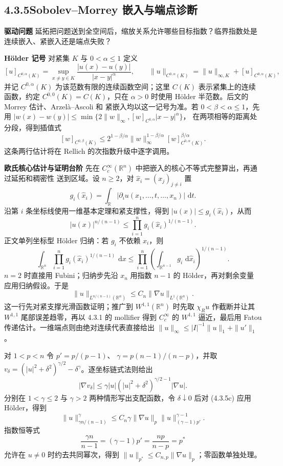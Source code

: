 \documentclass[11pt,a4paper]{ctexart}
\newcommand{\R}{\mathbb R}
\newcommand{\dd}{\,\mathrm d}
\newcommand{\planitem}[1]{\par\smallskip\noindent\textcolor{deepblue}{\textbf{#1}}\quad}
\newcommand{\unithead}[2]{\subsection{#1\quad #2}}
\begin{document}
\unithead{4.3.5}{Sobolev--Morrey 嵌入与端点诊断}

\planitem{驱动问题}
延拓把问题送到全空间后，缩放关系允许哪些目标指数？临界指数处是连续嵌入、紧嵌入还是端点失败？

\planitem{H\"older 记号}
对紧集 $K$ 与 $0<\alpha\le1$ 定义
\[
[u]_{C^{0,\alpha}(K)}=\sup_{x\ne y\in K}
\frac{|u(x)-u(y)|}{|x-y|^\alpha},
\qquad
\|u\|_{C^{0,\alpha}(K)}=\|u\|_{\infty,K}+[u]_{C^{0,\alpha}(K)},
\]
并记 $C^{0,\alpha}(K)$ 为该范数有限的连续函数空间；这里 $C(K)$ 表示紧集上的连续函数，约定 $C^{0,0}(K)=C(K)$，只在
$\alpha>0$ 时使用 Hölder 半范数。后文的 Morrey 估计、Arzel\`a--Ascoli 和
紧嵌入均以这一记号为准。若 $0<\beta<\alpha\le1$，先用
$|w(x)-w(y)|\le\min\{2\|w\|_\infty,[w]_{C^{0,\alpha}}|x-y|^\alpha\}$，
在两项相等的距离处分段，得到插值式
\[
 [w]_{C^{0,\beta}(K)}
 \le 2^{1-\beta/\alpha}\|w\|_\infty^{1-\beta/\alpha}
 [w]_{C^{0,\alpha}(K)}^{\beta/\alpha}.
\]
这条两行估计将在 Rellich 的次指数升级中逐字调用。

\planitem{欧氏核心估计与证明台阶}
先在 $C_c^\infty(\R^n)$ 中把嵌入的核心不等式完整算出，再通过延拓和稠密性
送到区域。设 $n\ge2$，对 $\widehat x_i=(x_j)_{j\ne i}$ 置
\[
 g_i(\widehat x_i)=\int_\R|\partial_i u(x_1,\ldots,t,\ldots,x_n)|\,\dd t .
\]
沿第 $i$ 条坐标线使用一维基本定理和紧支撑性，得到
$|u(x)|\le g_i(\widehat x_i)$，从而
\[
 |u(x)|^{n/(n-1)}\le
 \prod_{i=1}^n g_i(\widehat x_i)^{1/(n-1)}. \tag{4.3.5a}
\]
正文单列坐标型 Hölder 归纳：若 $g_i$ 不依赖 $x_i$，则
\[
 \int_{\R^n}\prod_{i=1}^n g_i(\widehat x_i)^{1/(n-1)}\,\dd x
 \le \prod_{i=1}^n\left(\int_{\R^{n-1}}g_i\,\dd\widehat x_i\right)^{1/(n-1)}. \tag{4.3.5b}
\]
$n=2$ 时直接用 Fubini；归纳步先沿 $x_n$ 用指数 $n-1$ 的 Hölder，再对剩余变量
应用归纳假设。于是
\[
 \|u\|_{L^{n/(n-1)}(\R^n)}\le C_n\|\nabla u\|_{L^1(\R^n)}. \tag{4.3.5c}
\]
这一行先对紧支撑光滑函数证明；推广到 $W^{1,1}(\R^n)$ 时先取
$\chi_Ru$ 作截断并让其 $W^{1,1}$ 尾部误差趋零，再以 4.3.1 的 mollifier 得到
$C_c^\infty$ 的 $W^{1,1}$ 逼近，最后用 Fatou 传递估计。一维端点则由绝对连续代表直接给出
$\|u\|_\infty\le |I|^{-1}\|u\|_1+\|u'\|_1$。

对 $1<p<n$ 令 $p'=p/(p-1)$、
$\gamma=p(n-1)/(n-p)$，并取
$v_\delta=(|u|^2+\delta^2)^{\gamma/2}-\delta^\gamma$。逐坐标链式法则给出
\[
 |\nabla v_\delta|\le
 \gamma |u|(|u|^2+\delta^2)^{\gamma/2-1}|\nabla u|. \tag{4.3.5d}
\]
分别在 $1<\gamma\le2$ 与 $\gamma>2$ 两种情形写出支配函数，令
$\delta\downarrow0$ 后对 (4.3.5c) 应用 Hölder，得到
\[
 \|u\|_{\gamma n/(n-1)}^\gamma
 \le C_n\gamma\|\nabla u\|_p
       \|u\|_{(\gamma-1)p'}^{\gamma-1}.
\]
指数恒等式
\[
 \frac{\gamma n}{n-1}=(\gamma-1)p'=\frac{np}{n-p}=p^*
\]
允许在 $u\ne0$ 时约去共同幂次，得到
$\|u\|_{p^*}\le C_{n,p}\|\nabla u\|_p$；零函数单独处理。
\end{document}
